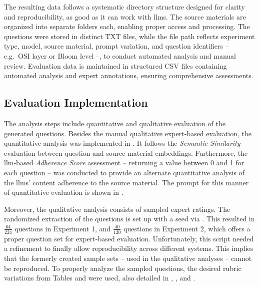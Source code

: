 \pagebreak

The resulting data follows a systematic directory structure designed for clarity and reproducibility, as good as it can work with \acp{llm}. The source materials are organized into separate folders each, enabling proper access and processing. The questions were stored in distinct TXT files, while the file path reflects experiment type, model, source material, prompt variation, and question identifiers -- e.g.\ OSI layer or Bloom level --, to conduct automated analysis and manual review. Evaluation data is maintained in structured CSV files containing automated analysis and expert annotations, ensuring comprehensive assessments.

\subsection{Evaluation Implementation}

The analysis steps include quantitative and qualitative evaluation of the generated questions. Besides the manual qualitative expert-based evaluation, the quantitative analysis was implemented in . It follows the \textit{Semantic Similarity} evaluation between question and source material embeddings. Furthermore, the \ac{llm}-based \textit{Adherence Score} assessment -- returning a value between 0 and 1 for each question -- was conducted to provide an alternate quantitative analysis of the \acp{llm}' content adherence to the source material. The prompt for this manner of quantitative evaluation is shown in .

Moreover, the qualitative analysis consists of sampled expert ratings. The randomized extraction of the questions is set up with a seed via . This resulted in $\frac{64}{224}$ questions in Experiment 1, and $\frac{40}{120}$ questions in Experiment 2, which offers a proper question set for expert-based evaluation. Unfortunately, this script needed a refinement to finally allow reproducibility across different systems. This implies that the formerly created sample sets -- used in the qualitative analyses -- cannot be reproduced. To properly analyze the sampled questions, the desired rubric variations from Tables  and  were used, also detailed in , , and .

